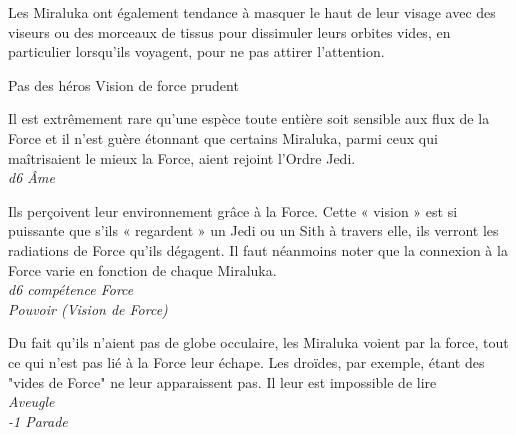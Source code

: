 Les Miraluka ont également tendance à masquer le haut de leur visage avec des viseurs ou des morceaux de tissus pour dissimuler leurs orbites vides, en particulier lorsqu'ils voyagent, pour ne pas attirer l'attention.

Pas des héros
Vision de force
prudent


\begin{description}[align=left]
\item [Sentibilité raciale à la force] 	%
		Il est extrêmement rare qu'une espèce toute entière soit sensible aux flux de la Force et il n'est guère étonnant que certains Miraluka, parmi ceux qui maîtrisaient le mieux la Force, aient rejoint l'Ordre Jedi.\\
		\emph{d6 \^Ame}
\item [Vision de force] 			%
		Ils perçoivent leur environnement grâce à la Force. Cette « vision » est si puissante que s’ils « regardent » un Jedi ou un Sith à travers elle, ils verront les radiations de Force qu’ils dégagent. Il faut néanmoins noter que la connexion à la Force varie en fonction de chaque Miraluka.\\
		\emph{d6 compétence Force}\\
		\emph{Pouvoir (Vision de Force)}
\item [Aveugle dans la lumière] 	%
		Du fait qu'ils n'aient pas de globe occulaire, les Miraluka voient par la force, tout ce qui n'est pas lié à la Force leur échape. Les droïdes, par exemple, étant des "vides de Force" ne leur apparaissent pas. Il leur est impossible de lire\\
		\emph{Aveugle}\\
		\emph{-1 Parade}
\end{description}